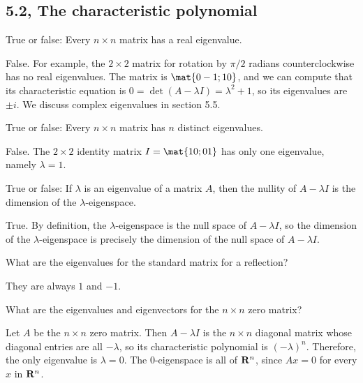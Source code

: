 \newpage

\subsection{5.2, The characteristic polynomial}
\begin{problems}
%
\problem %
True or false: Every $n \times n$ matrix has a real eigenvalue.

\begin{solution}
  False.  For example, the $2 \times 2$ matrix for rotation by $\pi/2$ radians
  counterclockwise has no real eigenvalues.  The matrix is $\mat{0 -1; 1 0}$,
  and we can compute that its characteristic equation is
  $0 = \det(A-\lambda I) = \lambda^2+1$, so its eigenvalues are $\pm i$.  We
  discuss complex eigenvalues in section 5.5.
\end{solution}

\problem %
True or false: Every $n \times n$ matrix has $n$ distinct eigenvalues.

\begin{solution}
False.  The $2 \times 2$ identity matrix $I = \mat{1 0; 0 1}$ has only one
eigenvalue, namely $\lambda = 1$.
\end{solution}

\problem %
True or false: If $\lambda$ is an eigenvalue of a matrix $A$, then the nullity
of $A- \lambda I$ is the dimension of the $\lambda$-eigenspace.

\begin{solution}
True.  By definition, the $\lambda$-eigenspace is the null space of 
$A-\lambda I$, so the dimension of the $\lambda$-eigenspace
is precisely the dimension of the null space of $A-\lambda I$.
\end{solution}


\problem %
What are the eigenvalues for the standard matrix for a reflection?

\begin{solution}
  They are always $1$ and $-1$.
\end{solution}

\problem %
What are the eigenvalues and eigenvectors for the $n \times n$ zero matrix?

\begin{solution}
  Let $A$ be the $n \times n$ zero matrix.  Then $A-\lambda I$ is the
  $n \times n$ diagonal matrix whose diagonal entries are all $-\lambda$, so its characteristic
  polynomial is $(-\lambda)^n$.  Therefore, the only eigenvalue is $\lambda = 0$.  The
  $0$-eigenspace is all of ${\bf R}^{n}$, since $Ax = 0$ for every $x$ in ${\bf R}^{n}$.
\end{solution}


\end{problems}
